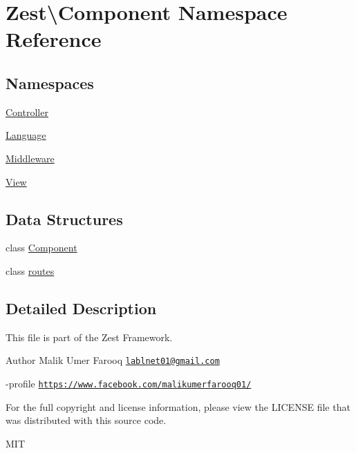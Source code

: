 \hypertarget{namespace_zest_1_1_component}{}\section{Zest\textbackslash{}Component Namespace Reference}
\label{namespace_zest_1_1_component}
\subsection*{Namespaces}
\begin{DoxyCompactItemize}
\item 
 \mbox{\hyperlink{namespace_zest_1_1_component_1_1_controller}{Controller}}
\item 
 \mbox{\hyperlink{namespace_zest_1_1_component_1_1_language}{Language}}
\item 
 \mbox{\hyperlink{namespace_zest_1_1_component_1_1_middleware}{Middleware}}
\item 
 \mbox{\hyperlink{namespace_zest_1_1_component_1_1_view}{View}}
\end{DoxyCompactItemize}
\subsection*{Data Structures}
\begin{DoxyCompactItemize}
\item 
class \mbox{\hyperlink{class_zest_1_1_component_1_1_component}{Component}}
\item 
class \mbox{\hyperlink{class_zest_1_1_component_1_1routes}{routes}}
\end{DoxyCompactItemize}


\subsection{Detailed Description}
This file is part of the Zest Framework.

\begin{DoxyAuthor}{Author}
Malik Umer Farooq \href{mailto:lablnet01@gmail.com}{\tt lablnet01@gmail.\+com} 

-\/profile \href{https://www.facebook.com/malikumerfarooq01/}{\tt https\+://www.\+facebook.\+com/malikumerfarooq01/}
\end{DoxyAuthor}
For the full copyright and license information, please view the L\+I\+C\+E\+N\+SE file that was distributed with this source code.

M\+IT


